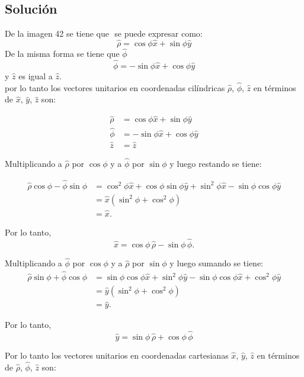 \documentclass[12pt]{article}
\begin{document}
\subsection*{ Solución }
De la imagen 42 se tiene que \(\) se puede expresar como:
\[ \hat{\rho} = \cos\phi\hat{x}  + \sin\phi\hat{y} \]
De la misma forma se tiene que \(\hat{\phi} \)
\[ \hat{\phi} = -\sin\phi\hat{x}  + \cos\phi\hat{y} \]
y \(\hat{z}\) es igual a \(\hat{z}\).\\

por lo tanto  los vectores unitarios en coordenadas cilíndricas \(\hat{\rho}\), \(\hat{\phi}\), \(\hat{z}\) en términos de \(\hat{x}\), \(\hat{y}\), \(\hat{z}\) son:

\begin{align*}
\hat{\rho} &= \cos\phi\hat{x}  + \sin\phi\hat{y} \\
\hat{\phi} &= -\sin\phi\hat{x}  + \cos\phi\hat{y} \\
\hat{z}  & = \hat{z}
\end{align*}

Multiplicando  a \(\hat{\rho} \) por \(\cos \phi\)  y a \(\hat{\phi} \)  por \(\sin \phi\) y luego restando se tiene:


\begin{align*}
\hat{\rho} \cos \phi - \hat{\phi} \sin \phi &= \cos^2 \phi \hat{x} + \cos \phi \sin \phi \hat{y} + \sin^2 \phi \hat{x} - \sin \phi \cos \phi \hat{y} \\
&= \hat{x}(\sin^2 \phi + \cos^2 \phi) \\
&= \hat{x}.
\end{align*}

Por lo tanto,  
\[
\hat{x} = \cos \phi \,\hat{\rho} - \sin \phi \,\hat{\phi}.
\]

Multiplicando  a \(\hat{\phi} \) por \(\cos \phi\)  y a \(\hat{\rho} \)  por \(\sin \phi\) y luego sumando se tiene:
\begin{align*}
\hat{\rho} \sin \phi + \hat{\phi} \cos \phi &= \sin \phi \cos \phi \hat{x} + \sin^2 \phi \hat{y} - \sin \phi \cos \phi \hat{x} + \cos^2 \phi \hat{y} \\
&= \hat{y}(\sin^2 \phi + \cos^2 \phi) \\
&= \hat{y}.
\end{align*}

Por lo tanto,  
\[
\hat{y} = \sin \phi \,\hat{\rho} + \cos \phi \,\hat{\phi}
\]

Por lo tanto  los vectores unitarios en coordenadas cartesianas  \(\hat{x}\), \(\hat{y}\), \(\hat{z}\) en términos de \(\hat{\rho}\), \(\hat{\phi}\), \(\hat{z}\) son:
\end{document}

